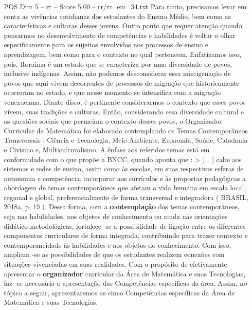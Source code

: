 \begin{textsample}{POS Dim 5 – rr – Score 5.00 – rr/rr\_em\_34.txt}
Para tanto, precisamos levar em conta as vivências cotidianas dos estudantes do Ensino Médio, bem como as características e culturas desses jovens.
Outro ponto que requer atenção quando pensarmos no desenvolvimento de competências e habilidades é voltar o olhar especificamente para os sujeitos envolvidos nos processos de ensino e aprendizagem, bem como para o contexto no qual pertencem.
Enfatizamos isso, pois, Roraima é um estado que se caracteriza por uma diversidade de povos, inclusive indígenas.
Assim, não podemos desconsiderar essa miscigenação de povos que aqui vivem decorrentes de processos de migração que historicamente ocorreram no estado, e que nesse momento se intensifica com a migração venezuelana.
Diante disso, é pertinente considerarmos o contexto que esses povos vivem, suas tradições e culturas.
Então, considerando essa diversidade cultural e as questões sociais que permeiam o contexto desses povos, o Organizador Curricular de Matemática foi elaborado contemplando os Temas Contemporâneos Transversais : Ciência e Tecnologia, Meio Ambiente, Economia, Saúde, Cidadania e Civismo e, Multiculturalismo.
A ênfase aos referidos temas está em conformidade com o que propõe a BNCC, quando aponta que : > [... ] cabe aos sistemas e redes de ensino, assim como às escolas, em suas respectivas esferas de autonomia e competência, incorporar aos currículos e às propostas pedagógicas a abordagem de temas contemporâneos que afetam a vida humana em escala local, regional e global, preferencialmente de forma transversal e integradora ( BRASIL, 2018a, p. 19 ).
Dessa forma, com a \textbf{contemplação} dos temas contemporâneos, seja nas habilidades, nos objetos de conhecimento ou ainda nas orientações didático metodológicas, fortalece -se a possibilidade de ligação entre os diferentes componentes curriculares de forma integrada, contribuindo para trazer contexto e contemporaneidade às habilidades e aos objetos do conhecimento.
Com isso, ampliam -se as possibilidades de que os estudantes realizem conexões com situações vivenciadas em suas realidades.
Com o propósito de efetivamente apresentar o \textbf{organizador} curricular da Área de Matemática e suas Tecnologias, faz -se necessária a apresentação das Competências específicas da área.
Assim, no tópico a seguir, apresentaremos as cinco Competências específicas da Área de Matemática e suas Tecnologias.

\end{textsample}
